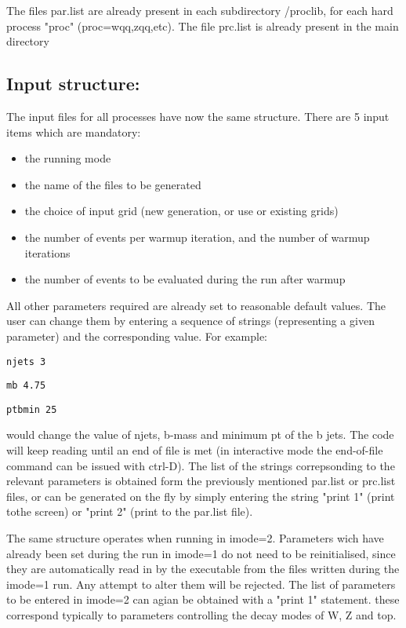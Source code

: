 \documentclass[paper]{JHEP3}
\begin{document}
\begin{appendix}
The files par.list are already present in each subdirectory /proclib, for each
hard process "proc" (proc=wqq,zqq,etc). 
The file prc.list is already present in the main directory

 \subsection{Input structure:} 
The input files for all processes have now the same structure. There
are 5 input items which are mandatory:
\begin{itemize}
\item the running mode
\item the name of the files to be generated
\item the choice of input grid (new generation, or use or existing grids)
\item the number of events per warmup iteration, and the number of warmup
iterations
\item the number of events to be evaluated during the run after warmup
\end{itemize} 
 
All other parameters required are already set to reasonable default
values. The user can change them by entering a sequence of strings
(representing a given parameter) and the corresponding value. For
example:
 
{\tt njets 3}
 
{\tt mb 4.75}
 
{\tt ptbmin 25}
 
would change the value of njets, b-mass and minimum pt of the b jets.
The code will keep reading until an end of file is met (in interactive
mode the end-of-file command can be issued with ctrl-D). The list of
the strings correpsonding to the relevant parameters is obtained form
the previously mentioned par.list or prc.list files, or can be
generated on the fly by simply entering the string "print 1" (print
tothe screen) or "print 2" (print to the par.list file).

The same structure operates when running in imode=2. Parameters wich
have already been set during the run in imode=1 do not need to be
reinitialised, since they are automatically read in by the executable
from the files written during the imode=1 run. Any attempt to alter
them will be rejected. The list of parameters to be entered in imode=2
can agian be obtained with a "print 1" statement. these correspond
typically to parameters controlling the decay modes of W, Z and top.


\end{appendix}
\end{document}
